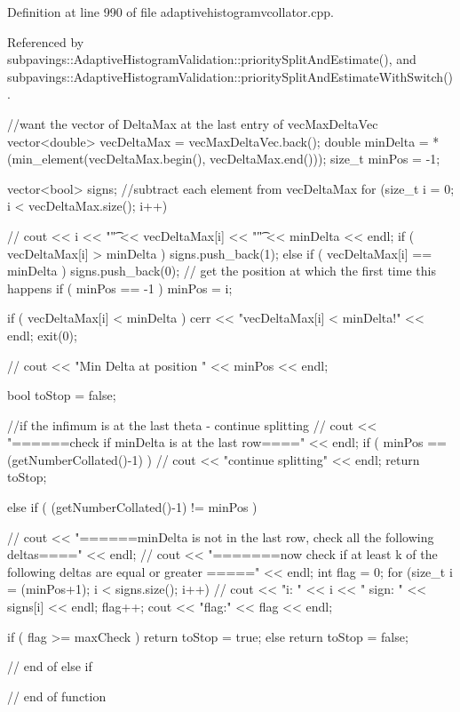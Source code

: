 \-Definition at line 990 of file adaptivehistogramvcollator.\-cpp.



\-Referenced by subpavings\-::\-Adaptive\-Histogram\-Validation\-::priority\-Split\-And\-Estimate(), and subpavings\-::\-Adaptive\-Histogram\-Validation\-::priority\-Split\-And\-Estimate\-With\-Switch().


\begin{DoxyCode}
{
  //want the vector of DeltaMax at the last entry of vecMaxDeltaVec 
  vector<double> vecDeltaMax = vecMaxDeltaVec.back();
  double minDelta = *(min_element(vecDeltaMax.begin(), vecDeltaMax.end()));
  size_t minPos = -1;
  
  vector<bool> signs;
  //subtract each element from vecDeltaMax
  for (size_t i = 0; i < vecDeltaMax.size(); i++) {
//    cout << i << "\t" << vecDeltaMax[i] << "\t" << minDelta << endl;
    if ( vecDeltaMax[i]  > minDelta ) { signs.push_back(1); }
    else if ( vecDeltaMax[i] == minDelta ) {  
      signs.push_back(0); 
      // get the position at which the first time this happens
      if ( minPos == -1 ) { minPos = i; }
    }

    if ( vecDeltaMax[i] < minDelta ) {
      cerr << "vecDeltaMax[i] < minDelta!" << endl;
      exit(0);
    }
  }
  
//  cout << "Min Delta at position " << minPos << endl;

  bool toStop = false;

  //if the infimum is at the last theta - continue splitting
//  cout << "======check if minDelta is at the last row====" << endl;
  if ( minPos == (getNumberCollated()-1) ) { 
//    cout << "continue splitting" << endl;
    return toStop;
  }
  
  else if ( (getNumberCollated()-1) != minPos ) {
//  cout << "======minDelta is not in the last row, check all the following
       deltas====" << endl;
//  cout << "=======now check if at least k of the following deltas are equal
       or greater =====" << endl;
    int flag = 0;
    for (size_t i = (minPos+1); i < signs.size(); i++) {
//      cout << "i: " << i << " sign: " << signs[i] << endl;
      flag++;
      cout << "flag:"  << flag << endl;
    }
  
    if ( flag >= maxCheck ) { return toStop = true;}
    else { return toStop = false; }
  } // end of else if
} // end of function
\end{DoxyCode}
